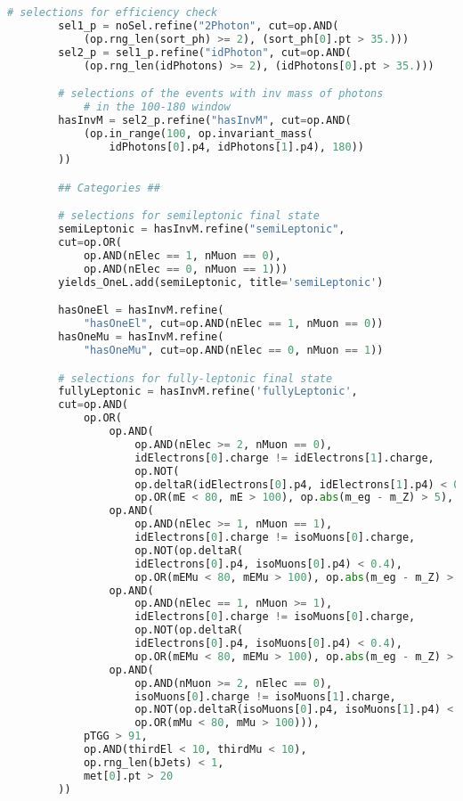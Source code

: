 \begin{lstlisting}[language=Python, caption=Python module of the analysis used in Bamboo framework, label={bamboocode}]
        # selections for efficiency check
        sel1_p = noSel.refine("2Photon", cut=op.AND(
            (op.rng_len(sort_ph) >= 2), (sort_ph[0].pt > 35.)))
        sel2_p = sel1_p.refine("idPhoton", cut=op.AND(
            (op.rng_len(idPhotons) >= 2), (idPhotons[0].pt > 35.)))

        # selections of the events with inv mass of photons 
            # in the 100-180 window
        hasInvM = sel2_p.refine("hasInvM", cut=op.AND(
            (op.in_range(100, op.invariant_mass(
                idPhotons[0].p4, idPhotons[1].p4), 180))
        ))

        ## Categories ##

        # selections for semileptonic final state
        semiLeptonic = hasInvM.refine("semiLeptonic",
        cut=op.OR(
            op.AND(nElec == 1, nMuon == 0),
            op.AND(nElec == 0, nMuon == 1)))
        yields_OneL.add(semiLeptonic, title='semiLeptonic')

        hasOneEl = hasInvM.refine(
            "hasOneEl", cut=op.AND(nElec == 1, nMuon == 0))
        hasOneMu = hasInvM.refine(
            "hasOneMu", cut=op.AND(nElec == 0, nMuon == 1))

        # selections for fully-leptonic final state
        fullyLeptonic = hasInvM.refine('fullyLeptonic',
        cut=op.AND(
            op.OR(
                op.AND(
                    op.AND(nElec >= 2, nMuon == 0),
                    idElectrons[0].charge != idElectrons[1].charge,
                    op.NOT(
                    op.deltaR(idElectrons[0].p4, idElectrons[1].p4) < 0.4),
                    op.OR(mE < 80, mE > 100), op.abs(m_eg - m_Z) > 5),
                op.AND(
                    op.AND(nElec >= 1, nMuon == 1),
                    idElectrons[0].charge != isoMuons[0].charge,
                    op.NOT(op.deltaR(
                    idElectrons[0].p4, isoMuons[0].p4) < 0.4),
                    op.OR(mEMu < 80, mEMu > 100), op.abs(m_eg - m_Z) > 5),
                op.AND(
                    op.AND(nElec == 1, nMuon >= 1),
                    idElectrons[0].charge != isoMuons[0].charge,
                    op.NOT(op.deltaR(
                    idElectrons[0].p4, isoMuons[0].p4) < 0.4),
                    op.OR(mEMu < 80, mEMu > 100), op.abs(m_eg - m_Z) > 5),
                op.AND(
                    op.AND(nMuon >= 2, nElec == 0),
                    isoMuons[0].charge != isoMuons[1].charge,
                    op.NOT(op.deltaR(isoMuons[0].p4, isoMuons[1].p4) < 0.4),
                    op.OR(mMu < 80, mMu > 100))),
            pTGG > 91,
            op.AND(thirdEl < 10, thirdMu < 10),
            op.rng_len(bJets) < 1,
            met[0].pt > 20
        ))


\end{lstlisting}
